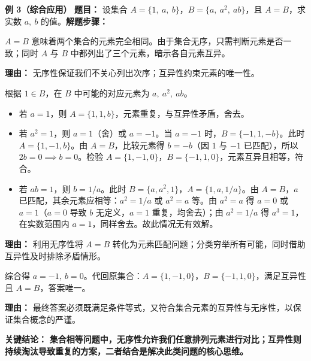 \begin{examplebox}
	\medskip
	\textbf{\textcolor{CExample}{例 3（综合应用）}}
	\textbf{\textcolor{CExample}{题目：}}
	设集合 $A=\{1,\ a,\ b\}$，$B=\{a,\ a^{2},\ ab\}$，且 $A=B$，求实数 $a,\ b$ 的值。\textbf{\textcolor{CExample}{解题步骤：}}
	\begin{description}[style=nextline, leftmargin=2.8em, labelsep=0.5em, itemsep=0.45em]
		\item[\textbf{第一步（理解条件）：}]
			$A=B$ 意味着两个集合的元素完全相同。由于集合无序，只需判断元素是否一致；同时 $A$ 与 $B$ 中都列出了三个元素，暗示各自元素互异。
			\par\textbf{理由：} 无序性保证我们不关心列出次序；互异性约束元素的唯一性。
		\item[\textbf{第二步（分类讨论）：}]
			根据 $1\in B$，在 $B$ 中可能的对应元素为 $a,\ a^{2},\ ab$。
			\begin{itemize}[leftmargin=*, itemsep=0.3em]
			\item 若 $a=1$，则 $A=\{1,1,b\}$，元素重复，与互异性矛盾，舍去。
			\item 若 $a^{2}=1$，则 $a=1$（舍）或 $a=-1$。当 $a=-1$ 时，$B=\{-1,1,-b\}$。此时 $A=\{1,-1,b\}$。由 $A=B$，比较元素得 $b=-b$（因 $1$ 与 $-1$ 已匹配），所以 $2b=0\implies b=0$。检验 $A=\{1,-1,0\}$，$B=\{-1,1,0\}$，元素互异且相等，符合。
			\item 若 $ab=1$，则 $b=1/a$。此时 $B=\{a,a^{2},1\}$，$A=\{1,a,1/a\}$。由 $A=B$，$a$ 已匹配，其余元素应相等：$a^{2}=1/a$ 或 $a^{2}=a$ 等。由 $a^{2}=a$ 得 $a=0$ 或 $a=1$（$a=0$ 导致 $b$ 无定义，$a=1$ 重复，均舍去）；由 $a^{2}=1/a$ 得 $a^{3}=1$，在实数范围内 $a=1$，同样舍去。故此情况无有效解。
		\end{itemize}
			\par\textbf{理由：} 利用无序性将 $A=B$ 转化为元素匹配问题；分类穷举所有可能，同时借助互异性及时排除矛盾情形。
		\item[\textbf{第三步（结论检验）：}]
			综合得 $a=-1,\ b=0$。代回原集合：$A=\{1,-1,0\}$，$B=\{-1,1,0\}$，满足互异性且 $A=B$，答案唯一。
			\par\textbf{理由：} 最终答案必须既满足条件等式，又符合集合元素的互异性与无序性，以保证集合概念的严谨。
	\end{description}
	\textbf{\textcolor{CExample}{关键结论：}}
	\textbf{集合相等问题中，无序性允许我们任意排列元素进行对比；互异性则持续淘汰导致重复的方案，二者结合是解决此类问题的核心思维。}
\end{examplebox}
